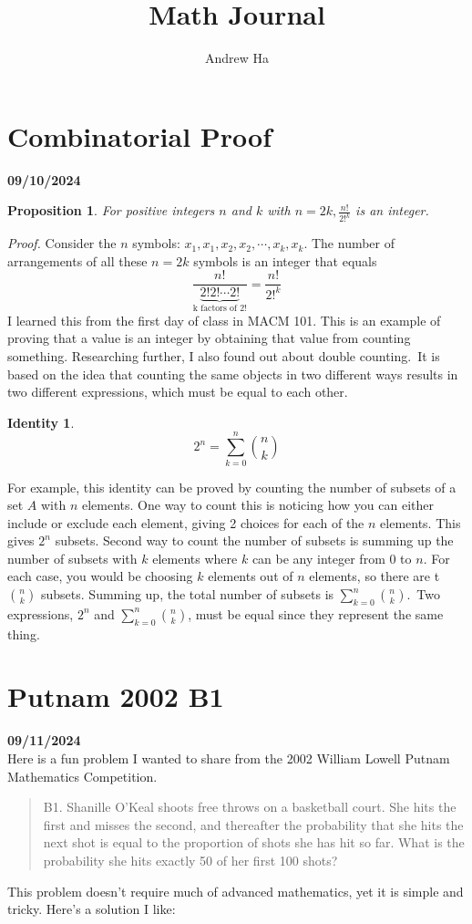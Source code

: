 \documentclass[12pt, oneside]{article}
\title{Math Journal}
\author{Andrew Ha}
\date{}								%
\newtheorem{proposition}{Proposition}
\newtheorem{identity}{Identity}
\begin{document}
\maketitle
\section*{Combinatorial Proof}
\textbf{09/10/2024}
\begin{proposition} For positive integers $n$ and $k$ with $n=2k, \frac{n!}{2!^k}$ is an integer. \end{proposition}
\emph{Proof.}  Consider the $n$ symbols: $x_1, x_1, x_2, x_2, \cdots, x_k, x_k$.
The number of arrangements of all these $n = 2k$ symbols is an integer that equals
\[
\frac{n!}{\underbrace{2! 2! \cdots 2!}_{\text{k factors of 2!}}} = \frac{n!}{2!^k}
\]
I learned this from the first day of class in MACM 101. This is an example of proving that a value is an integer by obtaining that value from counting something. Researching further, I also found out about double counting.\ It is based on the idea that counting the same objects in two different ways results in two different expressions, which must be equal to each other. 
\begin{identity}
\[
2^n = \sum_{k=0}^{n}  \binom{n}{k}
\]
\end{identity}
For example, this identity can be proved by counting the number of subsets of a set $A$ with $n$ elements. One way to count this is noticing how you can either include or exclude each element, giving 2 choices for each of the $n$ elements. This gives $2^n$ subsets. Second way to count the number of subsets is summing up the number of subsets with $k$ elements where $k$ can be any integer from 0 to $n$. For each case, you would be choosing $k$ elements out of $n$ elements, so there are t$\binom{n}{k}$ subsets.
Summing up, the total number of subsets is $\sum_{k=0}^{n}  \binom{n}{k}$.\ Two expressions, $2^n$ and $\sum_{k=0}^{n}  \binom{n}{k}$, must be equal since they represent the same thing.
\section*{Putnam 2002 B1}
\textbf{09/11/2024}
\\
\noindent Here is a fun problem I wanted to share from the 2002 William Lowell Putnam Mathematics Competition.
\begin{quote}
B1. Shanille O'Keal shoots free throws on a basketball court. She hits
the first and misses the second, and thereafter the probability that
she hits the next shot is equal to the proportion of shots she
has hit so far. What is the probability she hits exactly 50 of
her first 100 shots?
\end{quote}
This problem doesn't require much of advanced mathematics, yet it is simple and tricky. Here's a solution I like:\\
\end{document}
